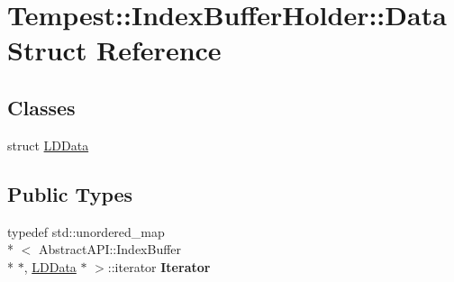\hypertarget{struct_index_buffer_holder_1_1_data}{\section{Tempest\+:\+:Index\+Buffer\+Holder\+:\+:Data Struct Reference}
\label{struct_index_buffer_holder_1_1_data}
}
\subsection*{Classes}
\begin{DoxyCompactItemize}
\item 
struct \hyperlink{struct_index_buffer_holder_1_1_data_1_1_l_d_data}{L\+D\+Data}
\end{DoxyCompactItemize}
\subsection*{Public Types}
\begin{DoxyCompactItemize}
\item 
\hypertarget{struct_index_buffer_holder_1_1_data_a352c08519c48007e32628d8c0333a50f}{typedef std\+::unordered\+\_\+map\\*
$<$ Abstract\+A\+P\+I\+::\+Index\+Buffer \\*
$\ast$, \hyperlink{struct_index_buffer_holder_1_1_data_1_1_l_d_data}{L\+D\+Data} $\ast$ $>$\+::iterator {\bfseries Iterator}}\label{struct_index_buffer_holder_1_1_data_a352c08519c48007e32628d8c0333a50f}

\end{DoxyCompactItemize}
